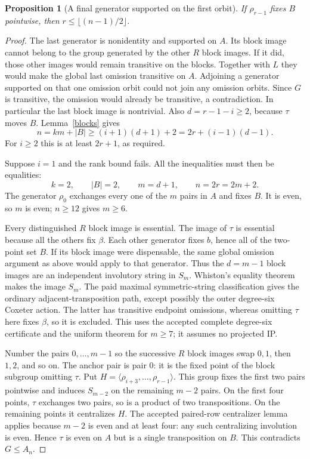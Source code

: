 \documentclass[11pt,a4paper]{article}
\newtheorem{proposition}[lemma]{Proposition}
\newcommand{\gen}[1]{\langle#1\rangle}
\begin{document}
\begin{proposition}[A final generator supported on the first orbit]
\label{first}
If $\rho_{r-1}$ fixes $B$ pointwise, then
$r\leq\lfloor(n-1)/2\rfloor$.
\end{proposition}
\begin{proof}
The last generator is nonidentity and supported on $A$.
Its block image cannot belong to the group generated by the
other $R$ block images. If it did, those other images would
remain transitive on the blocks. Together with $L$ they would
make the global last omission transitive on $A$. Adjoining a
generator supported on that one omission orbit could not join
any omission orbits. Since $G$ is transitive, the omission would
already be transitive, a contradiction. In particular the last
block image is nontrivial. Also $d=r-1-i\geq2$, because $\tau$
moves $B$. Lemma~\ref{blocks} gives
\[
 n=km+|B|\geq(i+1)(d+1)+2
       =2r+(i-1)(d-1).
\]
For $i\geq2$ this is at least $2r+1$, as required.

Suppose $i=1$ and the rank bound fails. All the inequalities
must then be equalities:
\[
 k=2,\qquad |B|=2,\qquad m=d+1,\qquad n=2r=2m+2.
\]
The generator $\rho_0$ exchanges every one of the $m$ pairs in
$A$ and fixes $B$. It is even, so $m$ is even; $n\geq12$ gives
$m\geq6$.

Every distinguished $R$ block image is essential. The image of
$\tau$ is essential because all the others fix $\beta$.
Each other generator fixes $b$, hence all of the two-point set
$B$. If its block image were dispensable, the same global
omission argument as above would apply to that generator.
Thus the $d=m-1$ block images are an independent involutory
string in $S_m$. Whiston's equality theorem makes the image
$S_m$. The paid maximal symmetric-string classification gives
the ordinary adjacent-transposition path, except possibly the
outer degree-six Coxeter action. The latter has transitive
endpoint omissions, whereas omitting $\tau$ here fixes
$\beta$, so it is excluded. This uses the accepted complete
degree-six certificate and the uniform theorem for $m\geq7$;
it assumes no projected IP.

Number the pairs $0,\ldots,m-1$ so the successive $R$ block
images swap $0,1$, then $1,2$, and so on. The anchor pair is
pair $0$: it is the fixed point of the block subgroup omitting
$\tau$. Put $H=\gen{\rho_{i+3},\ldots,\rho_{r-1}}$.
This group fixes the first two pairs pointwise and induces
$S_{m-2}$ on the remaining $m-2$ pairs. On the first four
points, $\tau$ exchanges two pairs, so is a product of two
transpositions. On the remaining points it centralizes $H$.
The accepted paired-row centralizer lemma applies because
$m-2$ is even and at least four: any such centralizing
involution is even. Hence $\tau$ is even on $A$ but is a
single transposition on $B$. This contradicts $G\leq A_n$.
\end{proof}
\end{document}

